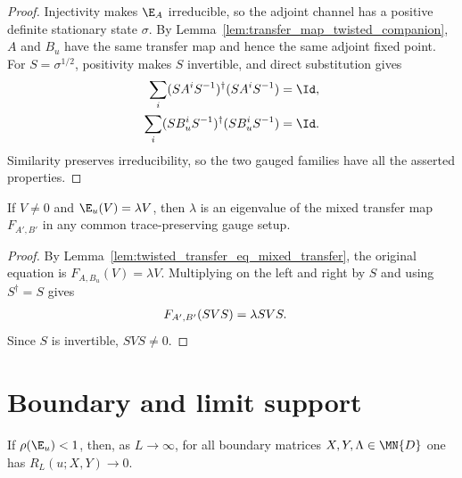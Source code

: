 \begin{proof}\leanok
    Injectivity makes $\E_A$ irreducible, so the adjoint channel has a positive
    definite stationary state $\sigma$. By
    Lemma~\ref{lem:transfer_map_twisted_companion}, $A$ and $B_u$ have the same
    transfer map and hence the same adjoint fixed point. For $S=\sigma^{1/2}$,
    positivity makes $S$ invertible, and direct substitution gives
    \begin{align}
        \sum_i(SA^iS^{-1})^\dagger(SA^iS^{-1})     & =\Id, \\
        \sum_i(SB_u^iS^{-1})^\dagger(SB_u^iS^{-1}) & =\Id.
        \notag
    \end{align}
    Similarity preserves irreducibility, so the two gauged families have all
    the asserted properties.
\end{proof}

\begin{lemma}
    \label{thm:twisted_tp_gauge_has_eigenvalue}
    \leanok
    If $V\ne0$ and $\E_u(V)=\lambda V$, then $\lambda$ is an eigenvalue of the
    mixed transfer map $F_{A',B'}$ in any common trace-preserving gauge setup.
\end{lemma}

\begin{proof}\leanok
    By Lemma~\ref{lem:twisted_transfer_eq_mixed_transfer}, the original
    equation is $F_{A,B_u}(V)=\lambda V$.  Multiplying on the left and right by
    $S$ and using $S^\dagger=S$ gives
    \begin{align}
        F_{A',B'}(SVS) & =\lambda SVS.
        \notag
    \end{align}
    Since $S$ is invertible, $SVS\ne0$.
\end{proof}

\section{Boundary and limit support}
\label{sec:app_symmetry_boundary_limits}

\begin{lemma}%
    \label{lem:boundary_string_order_tendsto_zero}
    \leanok
    If $\rho(\E_u) < 1$, then, as $L \to \infty$, for all boundary matrices
    $X,Y,\Lambda \in \MN{D}$ one has
    $R_L(u;X,Y) \longrightarrow 0$.
\end{lemma}

